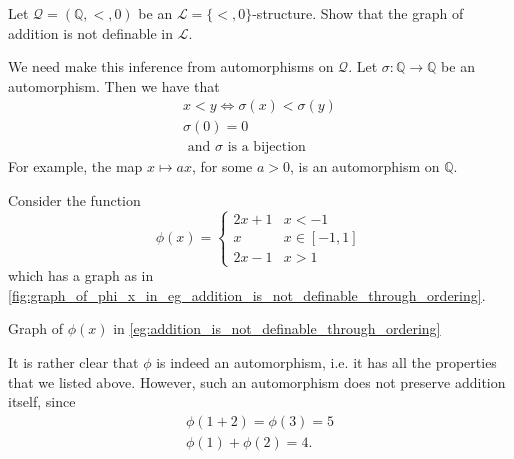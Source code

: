 \documentclass[notoc,notitlepage]{tufte-book}
\begin{document}
\begin{eg}\label{eg:addition_is_not_definable_through_ordering}
  Let $\mathcal{Q} = (\mathbb{Q}, <, 0)$ be an $\mathcal{L} = \{ <, 0 \}$-structure. Show that the graph of addition is not definable in $\mathcal{L}$.
\end{eg}

\begin{solution}
  We need make this inference from automorphisms on $\mathcal{Q}$. Let $\sigma : \mathbb{Q} \to \mathbb{Q}$ be an automorphism. Then we have that
  \begin{gather*}
    x < y \iff \sigma(x) < \sigma(y) \\
    \sigma(0) = 0 \\
    \text{ and } \sigma \text{ is a bijection }
  \end{gather*}
  For example, the map $x \mapsto ax$, for some $a > 0$, is an automorphism on $\mathbb{Q}$.

  Consider the function
  \begin{equation*}
    \phi(x) = \begin{cases}
      2x + 1 & x < -1 \\
      x      & x \in [-1, 1] \\
      2x - 1 & x > 1
    \end{cases}
  \end{equation*}
  which has a graph as in \cref{fig:graph_of_phi_x_in_eg_addition_is_not_definable_through_ordering}.
  \begin{marginfigure}
    \centering
    \caption{Graph of $\phi(x)$ in \cref{eg:addition_is_not_definable_through_ordering}}\label{fig:graph_of_phi_x_in_eg_addition_is_not_definable_through_ordering}
  \end{marginfigure}
  It is rather clear that $\phi$ is indeed an automorphism, i.e. it has all the properties that we listed above. However, such an automorphism does not preserve addition itself, since
  \begin{gather*}
    \phi(1 + 2) = \phi(3) = 5 \\
    \phi(1) + \phi(2) = 4.
  \end{gather*}
\end{solution}
\end{document}
